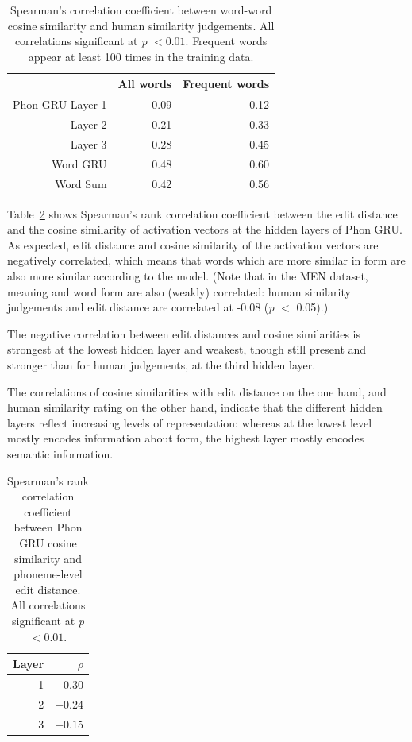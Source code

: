 \begin{table}[]
	\centering
	\begin{tabular}{rrr}
                          & All words & Frequent words \\\hline
{\sc Phon GRU} Layer 1 & 0.09 & 0.12\\
		  Layer 2 & 0.21 & 0.33 \\
		  Layer 3 & 0.28 & 0.45 \\
		\hline
{\sc Word GRU} & 0.48 & 0.60\\	\hline
{\sc Word Sum} & 0.42 & 0.56
	\end{tabular}
	\caption{Spearman's correlation coefficient between
          word-word cosine similarity and human similarity judgements. All
          correlations significant at \textit{p} $< 0.01$. Frequent
          words appear at least 100 times in the training data.} 
\label{tab:human}
\end{table}

Table~\ref{tab:edit} shows Spearman's rank correlation coefficient between the edit distance and the cosine similarity of activation vectors at the hidden layers of {\sc Phon GRU}.
As expected, edit distance and cosine similarity of the activation vectors are negatively correlated, which means that words which are more similar in form are also more similar according to the model. (Note that in the MEN dataset, meaning and word form are also (weakly) correlated: human similarity judgements and edit distance are correlated at -0.08 (\textit{p} $<$ 0.05).)

The negative correlation between edit distances and cosine similarities is strongest at the lowest hidden layer and weakest, though still present and stronger than for human judgements, at the third hidden layer. 

The correlations of cosine similarities with edit distance on the one hand, and human similarity rating on the other hand, indicate that the different hidden layers reflect increasing levels of representation: whereas at the lowest level mostly encodes information about form, the highest layer mostly encodes semantic information.

\begin{table}[]
	\centering
	\begin{tabular}{rr}
                Layer   & $\rho$ \\\hline
		      1 & $-0.30$ \\
		      2 & $-0.24$ \\
		      3 & $-0.15$
	\end{tabular}
	\caption{Spearman's rank correlation coefficient between
          {\sc Phon GRU} cosine similarity and phoneme-level edit distance. All correlations significant at \textit{p} $< 0.01$.} 
\label{tab:edit}
\end{table}

